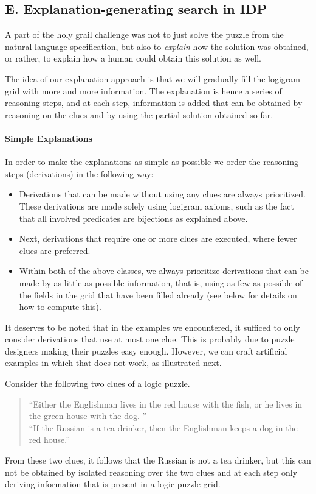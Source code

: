 \subsection{E. Explanation-generating search in IDP} 
A part of the holy grail challenge was not to just solve the puzzle from the natural language specification, but also to \emph{explain} how the solution was obtained, or rather, to explain how a human could obtain this solution as well. 

The idea of our explanation approach is that we will gradually fill the logigram grid with more and more information. The explanation is hence a series of reasoning steps, and at each step, information is added that can be obtained by reasoning on the clues and by using the partial solution obtained so far. 

\paragraph{Simple Explanations}
In order to make the explanations as simple as possible we order the reasoning steps (derivations) in the following way: 
\begin{itemize}
 \item Derivations that can be made without using any clues are always prioritized. These derivations are made solely using logigram axioms, such as the fact that all involved predicates are bijections as explained above. %
 \item Next, derivations that require one or more clues are executed, where fewer clues are preferred. 
 \item Within both of the above classes, we always prioritize derivations that can be made by as little as possible information, that is, using as few as possible of the fields in the grid that have been filled already (see below for details on how to compute this).
\end{itemize}
It deserves to be noted that in the examples we encountered, it sufficed to only consider derivations that use at most one clue. This is probably due to puzzle designers making their puzzles easy enough. However, we can craft artificial examples in which that does not work, as illustrated next. 
\begin{example}
 Consider the following two clues of a logic puzzle. 
 \begin{quote}
  ``Either the Englishman lives in the red house with the fish, or he lives in the green house with the dog. '' \\
  ``If the Russian is a tea drinker, then the Englishman keeps a dog in the red house.'' 
 \end{quote}
From these two clues, it follows that the Russian is not a tea drinker, but this can not be obtained by isolated reasoning over the two clues and at each step only deriving information that is present in a logic puzzle grid.
\end{example}

